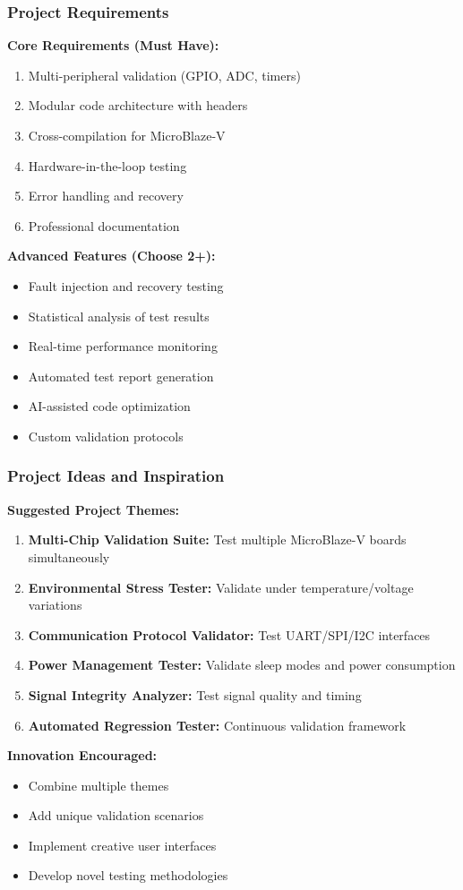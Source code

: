 \documentclass{beamer}
\begin{document}
\begin{frame}
\frametitle{Project Requirements}
\textbf{Core Requirements (Must Have):}
\begin{enumerate}
    \item Multi-peripheral validation (GPIO, ADC, timers)
    \item Modular code architecture with headers
    \item Cross-compilation for MicroBlaze-V
    \item Hardware-in-the-loop testing
    \item Error handling and recovery
    \item Professional documentation
\end{enumerate}

\vspace{0.5cm}
\textbf{Advanced Features (Choose 2+):}
\begin{itemize}
    \item Fault injection and recovery testing
    \item Statistical analysis of test results
    \item Real-time performance monitoring
    \item Automated test report generation
    \item AI-assisted code optimization
    \item Custom validation protocols
\end{itemize}
\end{frame}

\begin{frame}
\frametitle{Project Ideas and Inspiration}
\textbf{Suggested Project Themes:}

\begin{enumerate}
    \item \textbf{Multi-Chip Validation Suite:} Test multiple MicroBlaze-V boards simultaneously
    \item \textbf{Environmental Stress Tester:} Validate under temperature/voltage variations
    \item \textbf{Communication Protocol Validator:} Test UART/SPI/I2C interfaces
    \item \textbf{Power Management Tester:} Validate sleep modes and power consumption
    \item \textbf{Signal Integrity Analyzer:} Test signal quality and timing
    \item \textbf{Automated Regression Tester:} Continuous validation framework
\end{enumerate}

\vspace{0.5cm}
\textbf{Innovation Encouraged:}
\begin{itemize}
    \item Combine multiple themes
    \item Add unique validation scenarios
    \item Implement creative user interfaces
    \item Develop novel testing methodologies
\end{itemize}
\end{frame}
\end{document}

